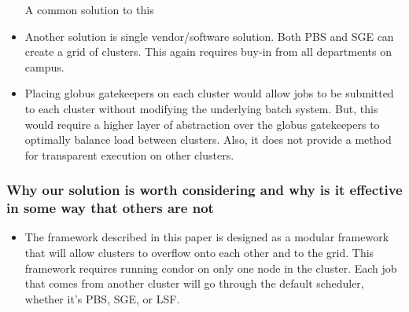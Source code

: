 \documentclass[11pt]{article}
\begin{document}
\begin{itemize}


A common solution to this

\item
Another solution is single vendor/software solution.  Both PBS and SGE can create a grid of clusters.  This again requires buy-in from all departments on campus.

\item
Placing globus gatekeepers on each cluster would allow jobs to be submitted to each cluster without modifying the underlying batch system.  But, this would require a higher layer of abstraction over the globus gatekeepers to optimally balance load between clusters.  Also, it does not provide a method for transparent execution on other clusters.



\end{itemize}


\subsubsection* {Why our solution is worth considering and why is it effective
in some way that others are not}

\begin{itemize}
\item The framework described in this paper is designed as a modular framework that will allow clusters to overflow onto each other and to the grid.  This framework requires running condor on only one node in the cluster.  Each job that comes from another cluster will go through the default scheduler, whether it's PBS, SGE, or LSF.


\end{itemize}
\end{document}
